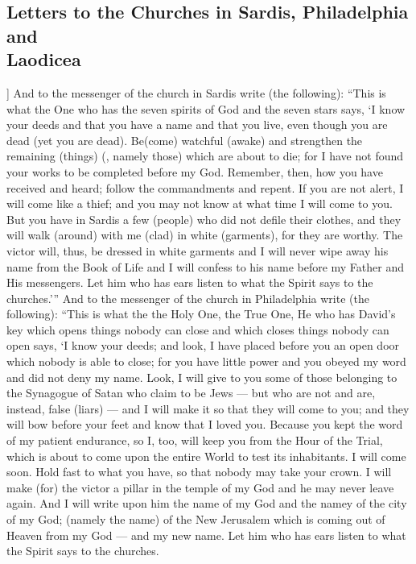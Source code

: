 \begin{pages}
\begin{Leftside}
        			\chapter{Letters to the Churches in Sardis, Philadelphia and \\ Laodicea}
				]
		And to the messenger of the church in Sardis write (the following): “This is what the One who has the seven spirits of God and the seven stars says, ‘I know your deeds and that you have a name and that you live, even though you are dead (yet you are dead). Be(come) watchful (awake) and strengthen the remaining (things) (, namely those) which are about to die; for I have not found your works to be completed before my God. Remember, then, how you have received and heard; follow the commandments and repent. If you are not alert, I will come like a thief; and you may not know at what time I will come to you.
		\pend
		\pstart
		But you have in Sardis a few (people) who did not defile their clothes, and they will walk (around) with me (clad) in white (garments), for they are worthy. The victor will, thus, be dressed in white garments and I will never wipe away his name from the Book of Life and I will confess to his name before my Father and His messengers. Let him who has ears listen to what the Spirit says to the churches.’”
		\pend
		\pstart
		And to the messenger of the church in Philadelphia write (the following): “This is what the the Holy One, the True One, He who has David’s key which opens things nobody can close and which closes things nobody can open says, ‘I know your deeds; and look, I have placed before you an open door which nobody is able to close; for you have little power and you obeyed my word and did not deny my name. Look, I will give to you some of those belonging to the Synagogue of Satan who claim to be Jews — but who are not and are, instead, false (liars) — and I will make it so that they will come to you; and they will bow before your feet and know that I loved you. Because you kept the word of my patient endurance, so I, too, will keep you from the Hour of the Trial, which is about to come upon the entire World to test its inhabitants. I will come soon. Hold fast to what you have, so that nobody may take your crown. I will make (for) the victor a pillar in the temple of my God and he may never leave again. And I will write upon him the name of my God and the namey of the city of my God; (namely the name) of the New Jerusalem which is coming out of Heaven from my God — and my new name. Let him who has ears listen to what the Spirit says to the churches.

\end{Leftside}
\end{pages}
